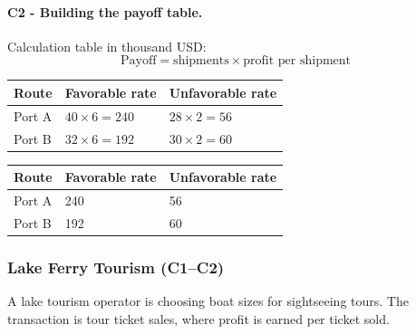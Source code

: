 
	\paragraph*{C2 - Building the payoff table.}
	\label{subsec:problem8-coffee-export-routes-c2}
	Calculation table in thousand USD:
	\[
	\text{Payoff}=\text{shipments}\times\text{profit per shipment}
	\]
	\begin{center}
		\begin{tabular}{lll}
			\toprule
			Route & Favorable rate & Unfavorable rate \\
			\midrule
			Port A & $40 \times 6 = 240$ & $28 \times 2 = 56$ \\
			Port B & $32 \times 6 = 192$ & $30 \times 2 = 60$ \\
			\bottomrule
		\end{tabular}
	\end{center}

	\begin{center}
		\begin{tabular}{lll}
			\toprule
			Route & Favorable rate & Unfavorable rate \\
			\midrule
			Port A & 240 & 56 \\
			Port B & 192 & 60 \\
			\bottomrule
		\end{tabular}
	\end{center}


	\subsubsection{Lake Ferry Tourism (C1--C2)}
	\label{sec:problem9-lake-ferry-tourism-c1-c2}
	A lake tourism operator is choosing boat sizes for sightseeing tours. The transaction is tour ticket sales, where profit is earned per ticket sold.

